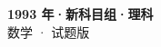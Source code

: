 \documentclass[zihao=-4, a4paper]{ctexart}
\begin{document}
\begin{center}
  {\Large\bfseries 1993 年·新科目组·理科}\\[4pt]
  {\large 数学 · 试题版}
\end{center}
\medskip
{}

\end{document}
